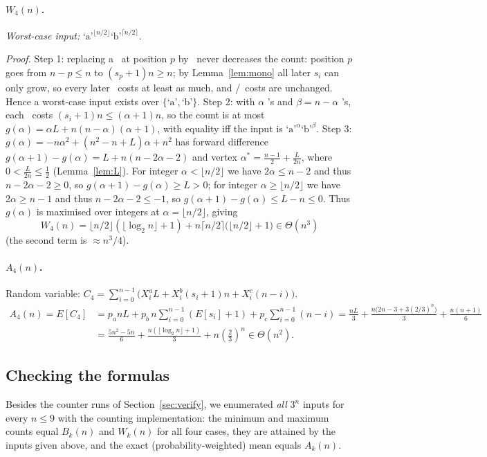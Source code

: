 \documentclass[11pt]{article}
\newcommand{\lgn}{\lfloor \log_2 n \rfloor}
\newcommand{\cha}{\text{`a'}}
\newcommand{\chb}{\text{`b'}}
\newcommand{\chc}{\text{`c'}}
\theoremstyle{remark}
\begin{document}
\paragraph{$W_4(n)$.} \emph{Worst-case input:}
$\cha^{\lfloor n/2\rfloor}\chb^{\lceil n/2\rceil}$.

\emph{Proof.} Step 1: replacing a \chc\ at position $p$ by \chb\ never decreases the count:
position $p$ goes from $n-p\le n$ to $(s_p+1)n\ge n$; by Lemma~\ref{lem:mono} all later
$s_i$ can only grow, so every later \chb\ costs at least as much, and \cha/\chc\ costs are
unchanged. Hence a worst-case input exists over $\{\cha,\chb\}$.
Step 2: with $\alpha$ \cha's and $\beta=n-\alpha$ \chb's, each \chb\ costs
$(s_i+1)n\le(\alpha+1)n$, so the count is at most $g(\alpha)=\alpha L+n(n-\alpha)(\alpha+1)$,
with equality iff the input is $\cha^\alpha\chb^\beta$.
Step 3: $g(\alpha)=-n\alpha^2+(n^2-n+L)\alpha+n^2$ has forward difference
$g(\alpha+1)-g(\alpha)=L+n(n-2\alpha-2)$ and vertex
$\alpha^*=\frac{n-1}{2}+\frac{L}{2n}$, where $0<\frac{L}{2n}\le\frac12$ (Lemma~\ref{lem:L}).
For integer $\alpha<\lfloor n/2\rfloor$ we have $2\alpha\le n-2$ and thus $n-2\alpha-2\ge 0$, so $g(\alpha+1)-g(\alpha)\ge L>0$;
for integer $\alpha\ge\lfloor n/2\rfloor$ we have $2\alpha\ge n-1$ and thus $n-2\alpha-2\le -1$, so $g(\alpha+1)-g(\alpha)\le L-n\le 0$.
Thus $g(\alpha)$ is maximised over integers at $\alpha=\lfloor n/2\rfloor$, giving
\[
W_4(n)=\lfloor n/2\rfloor(\lgn+1)+n\lceil n/2\rceil\bigl(\lfloor n/2\rfloor+1\bigr)\in\Theta(n^3)
\]
(the second term is $\approx n^3/4$).

\paragraph{$A_4(n)$.} Random variable: $C_4=\sum_{i=0}^{n-1}\bigl(X_i^aL+X_i^b(s_i+1)n+X_i^c(n-i)\bigr)$.
\begin{align*}
A_4(n)=E[C_4]&=p_a nL+p_b\,n\sum_{i=0}^{n-1}(E[s_i]+1)+p_c\sum_{i=0}^{n-1}(n-i)
=\frac{nL}{3}+\frac{n\bigl(2n-3+3(2/3)^n\bigr)}{3}+\frac{n(n+1)}{6}\\
&=\frac{5n^2-5n}{6}+\frac{n(\lgn+1)}{3}+n\left(\tfrac23\right)^n\in\Theta(n^2).
\end{align*}

\subsection*{Checking the formulas}
Besides the counter runs of Section~\ref{sec:verify}, we enumerated \emph{all} $3^n$
inputs for every $n\le 9$ with the counting implementation: the minimum and maximum
counts equal $B_k(n)$ and $W_k(n)$ for all four cases, they are attained by the inputs given
above, and the exact (probability-weighted) mean equals $A_k(n)$.
\end{document}
